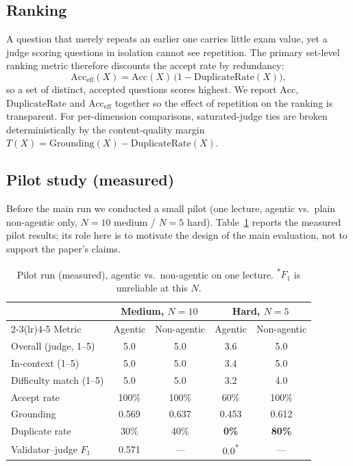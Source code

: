 \subsection{Ranking}
\label{sec:eval-ranking}

A question that merely repeats an earlier one carries little exam value, yet a
judge scoring questions in isolation cannot see repetition. The primary
set-level ranking metric therefore discounts the accept rate by redundancy:
\begin{equation}
  \mathrm{Acc}_{\mathrm{eff}}(X) = \mathrm{Acc}(X)\,\big(1-\mathrm{DuplicateRate}(X)\big),
  \label{eq:acceff}
\end{equation}
so a set of distinct, accepted questions scores highest. We report
$\mathrm{Acc}$, $\mathrm{DuplicateRate}$ and $\mathrm{Acc}_{\mathrm{eff}}$
together so the effect of repetition on the ranking is transparent. For
per-dimension comparisons, saturated-judge ties are broken deterministically by
the content-quality margin
$T(X)=\mathrm{Grounding}(X)-\mathrm{DuplicateRate}(X)$.

\subsection{Pilot study (measured)}
\label{sec:eval-pilot}

Before the main run we conducted a small pilot (one lecture, agentic vs.\
plain non-agentic only, $N{=}10$ medium / $N{=}5$ hard). Table~\ref{tab:pilot}
reports the measured pilot results; its role here is to motivate the design of
the main evaluation, not to support the paper's claims.

\begin{table}[t]
\centering
\small
\begin{tabular}{lcccc}
\toprule
 & \multicolumn{2}{c}{Medium, $N{=}10$} & \multicolumn{2}{c}{Hard, $N{=}5$} \\
\cmidrule(lr){2-3}\cmidrule(lr){4-5}
Metric & Agentic & Non-agentic & Agentic & Non-agentic \\
\midrule
Overall (judge, 1--5)   & 5.0  & 5.0  & 3.6  & 5.0 \\
In-context (1--5)        & 5.0  & 5.0  & 3.4  & 5.0 \\
Difficulty match (1--5)  & 5.0  & 5.0  & 3.2  & 4.0 \\
Accept rate              & 100\% & 100\% & 60\% & 100\% \\
Grounding                & 0.569 & 0.637 & 0.453 & 0.612 \\
Duplicate rate           & 30\% & 40\% & \textbf{0\%} & \textbf{80\%} \\
Validator--judge $F_1$   & 0.571 & --- & 0.0\textsuperscript{*} & --- \\
\bottomrule
\end{tabular}
\caption{Pilot run (measured), agentic vs.\ non-agentic on one lecture.
\textsuperscript{*}$F_1$ is unreliable at this $N$.}
\label{tab:pilot}
\end{table}


